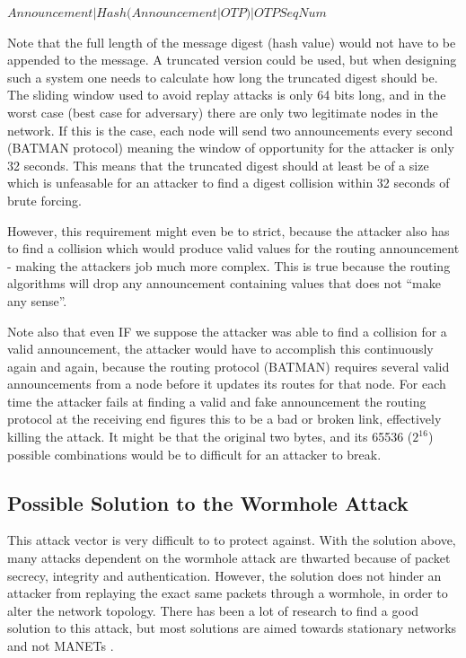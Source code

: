 $Announcement | Hash(Announcement | OTP) | OTPSeqNum$

Note that the full length of the message digest (hash value) would not have to
be appended to the message. A truncated version could be used, but when
designing such a system one needs to calculate how long the truncated digest
should be. The sliding window used to avoid replay attacks is only 64 bits long,
and in the worst case (best case for adversary) there are only two legitimate
nodes in the network. If this is the case, each node will send two
announcements every second (BATMAN protocol) meaning the window of opportunity
for the attacker is only 32 seconds. This means that the truncated digest should
at least be of a size which is unfeasable for an attacker to find a digest
collision within 32 seconds of brute forcing.

However, this requirement might even be to strict, because the attacker also has
to find a collision which would produce valid values for the routing
announcement - making the attackers job much more complex. This is true because
the routing algorithms will drop any announcement containing values that does
not ``make any sense''.

Note also that even IF we suppose the attacker was able to find a collision for
a valid announcement, the attacker would have to accomplish this continuously
again and again, because the routing protocol (BATMAN) requires several valid
announcements from a node before it updates its routes for that node. For each
time the attacker fails at finding a valid and fake announcement the routing
protocol at the receiving end figures this to be a bad or broken link,
effectively killing the attack. It might be that the original two bytes, and its
65536 ($2^16$) possible combinations would be to difficult for an attacker to
break.

\subsection{Possible Solution to the Wormhole Attack}
This attack vector is very difficult to to protect against. With the solution
above, many attacks dependent on the wormhole attack are thwarted because of
packet secrecy, integrity and authentication. However, the solution does not
hinder an attacker from replaying the exact same packets through a wormhole, in
order to alter the network topology. There has been a lot of research to find a
good solution to this attack, but most solutions are aimed towards stationary
networks and not \acp{MANET} \cite{raoteapproaches}.

